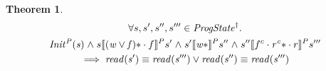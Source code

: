 \documentclass[letterpaper,twocolumn,10pt]{article}
\theoremstyle{definition}
\newtheorem{theorem}{Theorem}[section]
\newcommand{\conj}{\mathrel\land}
\renewcommand{\i}[1]{\ensuremath{\mathit{#1}}}
\begin{document}
\begin{theorem}
\begin{multline*}
      \forall s, s', s'', s''' \in \i{ProgState^\dagger} \ldotp\\\i{Init^P(s)} \conj s \llbracket \i{(w \lor f)\ast} \cdot f \rrbracket^P s' \conj
      s' \llbracket \i{w\ast} \rrbracket^P s'' \conj
      s'' \llbracket f^c \cdot \i{r^c\ast} \cdot r \rrbracket^P s'''\\
      \implies \i{read(s')} \equiv \i{read(s''')} \lor \i{read(s'')} \equiv \i{read(s''')}
\end{multline*}
\end{theorem}
\end{document}
